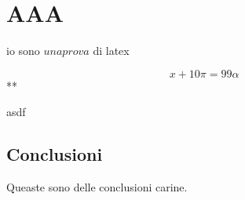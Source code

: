 \section{AAA}
io sono $una prova$ di latex

$$
x+10 \pi = 99 \alpha
$$**

asdf

\subsection{Conclusioni}

Queaste sono delle conclusioni carine.
